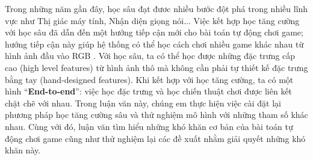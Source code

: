 Trong những năm gần đây, học sâu đạt đươc nhiều bước đột phá trong nhiều lĩnh vực như Thị giác máy tính, Nhận diện giọng nói...  
Việc kết hợp học tăng cường với học sâu đã dẫn đến một hướng tiếp cận mới cho bài toán tự động chơi game; hướng tiếp cận này giúp hệ thống có thể học cách chơi nhiều game khác nhau từ hình ảnh đầu vào RGB \cite{mnihdqn2015}. 
Với học sâu, ta có thể học được những đặc trưng cấp cao (high level features) từ hình ảnh thô mà không cần phải tự thiết kế đặc trưng bằng tay (hand-designed features). 
Khi kết hợp với học tăng cường, ta có một hình ``\textbf{End-to-end}'': việc học đặc trưng và học chiến thuật chơi được liên kết chặt chẽ với nhau. 
Trong luận văn này, chúng em thực hiện việc cài đặt lại phương pháp học tăng cường sâu và thử nghiệm mô hình với những tham số khác nhau. 
Cùng với đó, luận văn tìm hiểu những khó khăn cơ bản của bài toán tự động chơi game cũng như thử nghiệm lại các đề xuất nhằm giải quyết những khó khăn này.